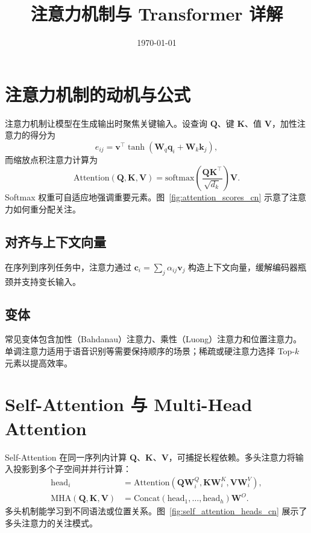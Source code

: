 ﻿\documentclass[UTF8,zihao=-4]{ctexart}
\title{注意力机制与 Transformer 详解}
\author{}
\date{\today}
\begin{document}
\maketitle

\section{注意力机制的动机与公式}
注意力机制让模型在生成输出时聚焦关键输入。设查询 $\mathbf{Q}$、键 $\mathbf{K}$、值 $\mathbf{V}$，加性注意力的得分为
\begin{equation}
  e_{ij} = \mathbf{v}^{\top} \tanh(\mathbf{W}_q \mathbf{q}_i + \mathbf{W}_k \mathbf{k}_j),
\end{equation}
而缩放点积注意力计算为
\begin{equation}
  \mathrm{Attention}(\mathbf{Q}, \mathbf{K}, \mathbf{V}) = \mathrm{softmax}\left( \frac{\mathbf{Q} \mathbf{K}^{\top}}{\sqrt{d_k}} \right) \mathbf{V}.
\end{equation}
Softmax 权重可自适应地强调重要元素。图~\ref{fig:attention_scores_cn} 示意了注意力如何重分配关注。

\subsection{对齐与上下文向量}
在序列到序列任务中，注意力通过 $\mathbf{c}_i = \sum_j \alpha_{ij} \mathbf{v}_j$ 构造上下文向量，缓解编码器瓶颈并支持变长输入。

\subsection{变体}
常见变体包含加性（Bahdanau）注意力、乘性（Luong）注意力和位置注意力。单调注意力适用于语音识别等需要保持顺序的场景；稀疏或硬注意力选择 Top-$k$ 元素以提高效率。

\section{Self-Attention 与 Multi-Head Attention}
Self-Attention 在同一序列内计算 $\mathbf{Q}$、$\mathbf{K}$、$\mathbf{V}$，可捕捉长程依赖。多头注意力将输入投影到多个子空间并并行计算：
\begin{align}
  \mathrm{head}_i &= \mathrm{Attention}(\mathbf{Q} \mathbf{W}_i^Q, \mathbf{K} \mathbf{W}_i^K, \mathbf{V} \mathbf{W}_i^V), \\
  \mathrm{MHA}(\mathbf{Q}, \mathbf{K}, \mathbf{V}) &= \mathrm{Concat}(\mathrm{head}_1, \ldots, \mathrm{head}_h) \mathbf{W}^O.
\end{align}
多头机制能学习到不同语法或位置关系。图~\ref{fig:self_attention_heads_cn} 展示了多头注意力的关注模式。
\end{document}

